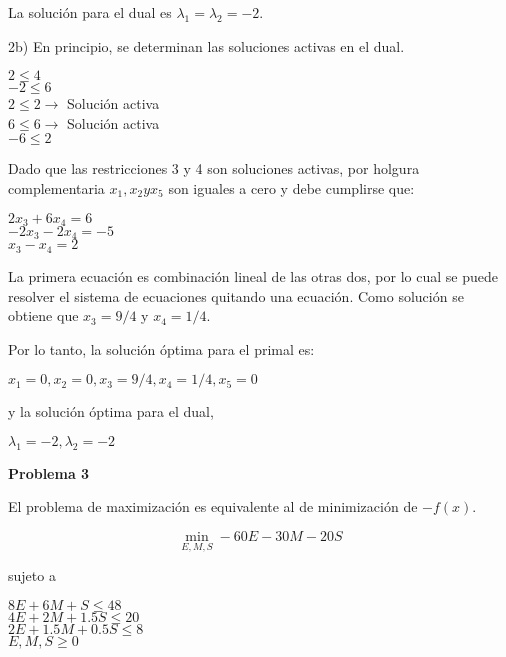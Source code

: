 \documentclass[10pt]{article}
\begin{document}
La soluci\'on para el dual es $\lambda_1 = \lambda_2 = -2$.
\bigskip

2b) En principio, se determinan las soluciones activas en el dual.

\begin{center}
$2	\leq	4$ \\
$-2	\leq	6$ \\
$2	\leq	2 \rightarrow$ Soluci\'on activa\\
$6	\leq	6 \rightarrow$ Soluci\'on activa \\
$-6	\leq	2$ \\

\end{center}


Dado que las restricciones 3 y 4 son soluciones activas, por holgura complementaria $x_1, x_2 y x_5$ son iguales a cero y debe cumplirse que:

\begin{center}
$2x_3+	6x_4 =	6$ \\
$-2x_3	-2x_4=-5$ \\
$x_3	-x_4 =	2$\\

\end{center}

La primera ecuaci\'on es combinaci\'on lineal de las otras dos, por lo cual se puede resolver el sistema de ecuaciones quitando una ecuaci\'on. Como soluci\'on se obtiene que $x_3=9/4$ y $x_4=1/4$.

Por lo tanto, la soluci\'on \'optima para el primal es: \\
\begin{center}
$x_1=0, x_2=0, x_3=9/4, x_4=1/4, x_5=0$

\end{center}

y la soluci\'on \'optima para el dual,

\begin{center}
$\lambda_1=-2, \lambda_2=-2$
\end{center}

{\bf \Large{Problema 3}}
\medskip

El problema de maximizaci\'on es equivalente al de minimizaci\'on de $-f(x)$.

\begin{center}
\[\min_{E,M,S} -60E-30M-20S \] 

sujeto a

$8E+6M+S\leq48$ \\
$4E+2M+1.5S\leq20$ \\
$2E+1.5M+0.5S\leq8$ \\
$E, M, S \geq 0$
\end{center}
\end{document}
